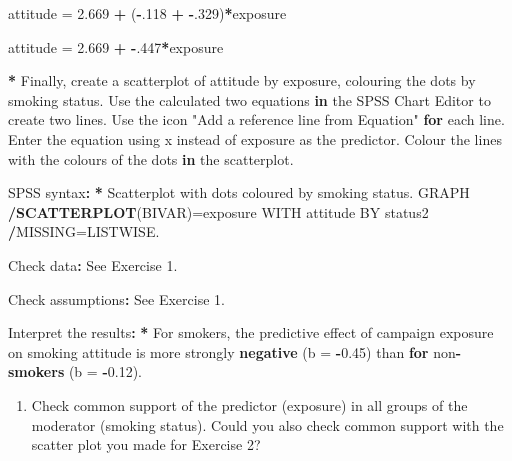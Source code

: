 \documentclass[a4paper]{book}
\newenvironment{Shaded}{\begin{snugshade}}{\end{snugshade}}
\newcommand{\KeywordTok}[1]{\textcolor[rgb]{0,0,0}{\textbf{#1}}}
\newcommand{\DataTypeTok}[1]{\textcolor[rgb]{0,0,0}{#1}}
\newcommand{\DecValTok}[1]{\textcolor[rgb]{0.00,0.00,0.00}{#1}}
\newcommand{\FloatTok}[1]{\textcolor[rgb]{0.00,0.00,0.00}{#1}}
\newcommand{\StringTok}[1]{\textcolor[rgb]{0.00,0.00,0.00}{#1}}
\newcommand{\ControlFlowTok}[1]{\textcolor[rgb]{0.00,0.00,0.00}{\textbf{#1}}}
\newcommand{\OperatorTok}[1]{\textcolor[rgb]{0.00,0.00,0.00}{\textbf{#1}}}
\newcommand{\ErrorTok}[1]{\textcolor[rgb]{0.00,0.00,0.00}{\textbf{#1}}}
\newcommand{\NormalTok}[1]{#1}
\providecommand{\tightlist}{%
  \setlength{\itemsep}{0pt}\setlength{\parskip}{0pt}}
\theoremstyle{definition}
\theoremstyle{definition}
\theoremstyle{definition}
\theoremstyle{remark}
\begin{document}
\begin{Shaded}
\begin{Highlighting}[]
\NormalTok{attitude =}\StringTok{ }\FloatTok{2.669} \OperatorTok{+}\StringTok{ }\NormalTok{(}\OperatorTok{-}\NormalTok{.}\DecValTok{118} \OperatorTok{+}\StringTok{ }\OperatorTok{-}\NormalTok{.}\DecValTok{329}\NormalTok{)}\OperatorTok{*}\NormalTok{exposure  }
  
\NormalTok{attitude =}\StringTok{ }\FloatTok{2.669} \OperatorTok{+}\StringTok{ }\OperatorTok{-}\NormalTok{.}\DecValTok{447}\OperatorTok{*}\NormalTok{exposure  }
  
\OperatorTok{*}\StringTok{ }\NormalTok{Finally, create a scatterplot of attitude by exposure, colouring the dots by}
\NormalTok{smoking status. Use the calculated two equations }\ControlFlowTok{in}\NormalTok{ the SPSS Chart Editor to}
\NormalTok{create two lines. Use the icon }\StringTok{"Add a reference line from Equation"} \ControlFlowTok{for}\NormalTok{ each}
\NormalTok{line. Enter the equation using x instead of exposure as the predictor. Colour}
\NormalTok{the lines with the colours of the dots }\ControlFlowTok{in}\NormalTok{ the scatterplot.}
  
\NormalTok{SPSS syntax}\OperatorTok{:}\StringTok{  }
\StringTok{  }
\ErrorTok{*}\StringTok{ }\NormalTok{Scatterplot with dots coloured by smoking status.  }
\NormalTok{GRAPH  }
  \OperatorTok{/}\KeywordTok{SCATTERPLOT}\NormalTok{(BIVAR)=exposure WITH attitude BY status2  }
  \OperatorTok{/}\NormalTok{MISSING=LISTWISE.  }
  
\NormalTok{Check data}\OperatorTok{:}\StringTok{  }
\StringTok{  }
\NormalTok{See Exercise }\DecValTok{1}\NormalTok{.  }
  
\NormalTok{Check assumptions}\OperatorTok{:}\StringTok{  }
\StringTok{  }
\NormalTok{See Exercise }\DecValTok{1}\NormalTok{.  }
  
\NormalTok{Interpret the results}\OperatorTok{:}\StringTok{  }
\StringTok{  }
\ErrorTok{*}\StringTok{ }\NormalTok{For smokers, the predictive effect of campaign exposure on smoking attitude}
\NormalTok{is more strongly }\KeywordTok{negative}\NormalTok{ (}\DataTypeTok{b =} \OperatorTok{-}\FloatTok{0.45}\NormalTok{) than }\ControlFlowTok{for}\NormalTok{ non}\OperatorTok{-}\KeywordTok{smokers}\NormalTok{ (}\DataTypeTok{b =} \OperatorTok{-}\FloatTok{0.12}\NormalTok{).}
\end{Highlighting}
\end{Shaded}

\begin{enumerate}
\def\labelenumi{\arabic{enumi}.}
\setcounter{enumi}{2}
\tightlist
\item
  Check common support of the predictor (exposure) in all groups of the
  moderator (smoking status). Could you also check common support with
  the scatter plot you made for Exercise 2?
\end{enumerate}
\end{document}

